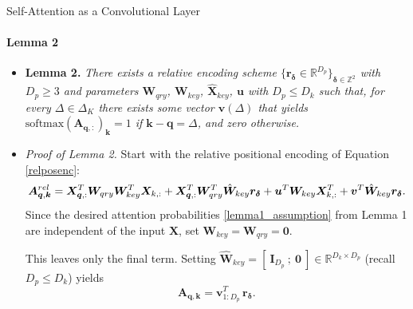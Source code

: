 \documentclass[9pt]{beamer}
\newcommand{\bb}{\mathbb}
\newcommand{\mb}{\bm}
\begin{document}
\newcommand{\brac}[1]{^{(#1)}}
\begin{frame}{Self-Attention as a Convolutional Layer}
\framesubtitle{Lemma 2}
\begin{itemize}
\item \textbf{Lemma 2.} {\em There exists a relative encoding scheme $\{\bm r_{\bm \delta} \in \bb R^{D_p}\}_{\bm \delta\in\bb Z^2}$ with $D_p\geq 3$ and parameters $\bm W_{qry}$, $\bm W_{key}$, $\hat{\bm X}_{key}$, $\bm u$ with $D_p\leq D_k$ such that, for every $\bm\varDelta \in \Delta_K$ there exists some vector $\bm v(\bm\varDelta)$ that yields $\mathrm{softmax}(\bm A_{\bm q,:})_{\bm k}=1$ if $\bm k - \bm q = \bm\varDelta$, and zero otherwise.}

\vspace{.1in}
\item \textit{Proof of Lemma 2.} Start with the relative positional encoding of Equation \eqref{relposenc}:
\begin{equation*}
    \mb A^{rel}_{\mb q, \mb k} = 
        \mb X_{\mb q,:}^T \WW \mb X_{k,:}
        + \mb X_{\mb q,:}^T \mb W_{qry}^T\hat{\mb W}_{key} \mb r_{\mb \delta}
        + \mb u^T \mb W_{key} \mb X^T_{k,:}
        + \mb v^T \hat{\mb W}_{key} \mb r_{\bm\delta}.
\end{equation*}
Since the desired attention probabilities \eqref{lemma1_assumption} from Lemma 1 are independent of the input $\bm X$, set $\bm W_{key}=\bm W_{qry} = \bm 0$. 

\vspace{.1in}
This leaves only the final term. Setting $\hat{\bm W}_{key} = [\ \bm I_{D_p}\ ; \ \bm 0\ ] \in \mathbb R^{D_k\times D_p}$ (recall $D_p\leq D_k$) yields
\begin{equation*}
    \mb A_{\mb q, \mb k} = \mb v_{1:D_p}^T\, \mb r_{\bm\delta}.
\end{equation*}
\end{itemize}
\end{frame}
\end{document}
